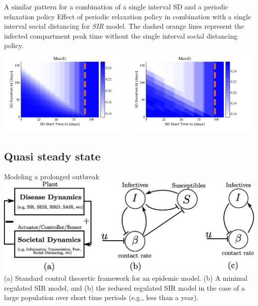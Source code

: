 \documentclass[10pt]{beamer}
\begin{document}
\begin{frame}{A similar pattern for a combination of a single interval SD and a periodic relaxation policy}
	Effect of periodic relaxation policy in combination with a single interval social distancing for \textit{SIR} model. The dashed orange lines represent the infected compartment peak time without the single interval social distancing policy. \\ \vspace{0.5cm}
	\includegraphics[width=0.49\textwidth]{epidemic-sp-heatmap1.png}
	\includegraphics[width=0.49\textwidth]{epidemic-sp-heatmap2.png} 
\end{frame}

\subsection{Quasi steady state}
\begin{frame}{Modeling a prolonged outbreak}
	\includegraphics[width=1\textwidth]{epidemic-qss.eps} \\ \vspace{0.5cm}
	\small
	(a) Standard control theoretic framework for an epidemic model. (b) A minimal regulated SIR model, and (b) the reduced regulated SIR model in the case of a large population over short time periods (e.g., less than a year).
\end{frame}
\end{document}
